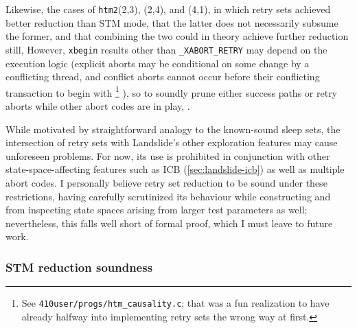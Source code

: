 Likewise, the cases of {\tt htm2}(2,3), (2,4), and (4,1),
in which retry sets achieved better reduction than STM mode,
 that the latter does not necessarily subsume the former,
and that combining the two could in theory achieve further reduction still,
However, {\tt xbegin} results other than {\tt \_XABORT\_RETRY}
may depend on the execution logic
(explicit aborts may be conditional on some change by a conflicting thread,
and conflict aborts cannot occur before their conflicting transaction to begin with%
\footnote{See {\tt 410user/progs/htm\_causality.c}; that was a fun realization to have
already halfway into implementing retry sets the wrong way at first.}%
),
so 
to soundly prune either success paths or retry aborts
while other abort codes are in play,
.

While
motivated by straightforward analogy to the known-sound sleep sets,
the intersection of retry sets with Landslide's other exploration features may cause unforeseen problems.
For now, its use is prohibited in conjunction with other state-space-affecting features
such as ICB (\cref{sec:landslide-icb})
as well as multiple abort codes.
I personally believe retry set reduction to be sound under these restrictions,
having carefully scrutinized its behaviour
while constructing 
and from inspecting state spaces arising from larger test parameters as well; %
nevertheless, this falls well short of formal proof, which I must leave to future work.

\subsubsection{STM reduction soundness}

